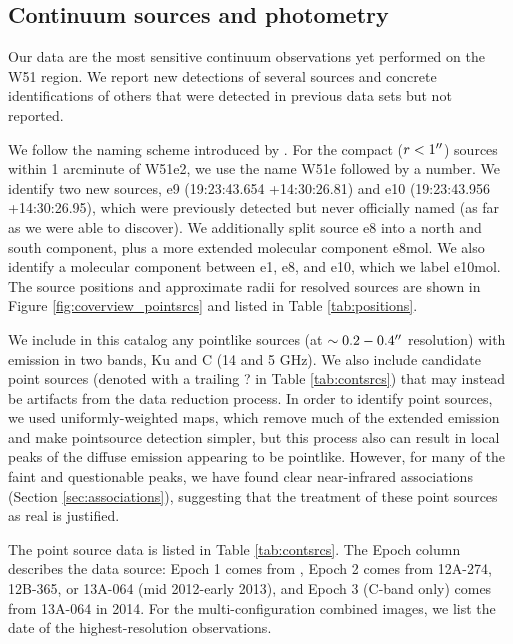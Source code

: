 \subsection{Continuum sources and photometry}
\label{sec:pointsources}
Our data are the most sensitive continuum observations yet performed on the W51
region.  We report new detections of several sources and concrete
identifications of others that were detected in previous data sets but not
reported.

We follow the naming scheme introduced by \citet{Mehringer1994a}.  For the
compact ($r<1\mbox{$^{\prime\prime}$}$) sources within 1 arcminute of W51e2, we use the name
W51e followed by a number.  We identify two new sources, e9 (19:23:43.654
+14:30:26.81) and e10 (19:23:43.956 +14:30:26.95), which were previously
detected but never officially named (as far as we were able to discover).
We additionally split source e8 into a north and south component, plus a more
extended molecular component e8mol.  We also identify a molecular component
between e1, e8, and e10, which we label e10mol.  The source positions
and approximate radii for resolved sources are shown in Figure
\ref{fig:coverview_pointsrcs} and listed in Table \ref{tab:positions}.



We include in this catalog any pointlike sources (at $\sim0.2-0.4\mbox{$^{\prime\prime}$}$
resolution) with emission in two bands, Ku and C (14 and 5 GHz).  We also
include candidate point sources (denoted with a trailing ? in Table
\ref{tab:contsrcs}) that may instead be artifacts from the data reduction
process.  In order to identify point sources, we used
uniformly-weighted maps, which remove much of the extended emission and make
pointsource detection simpler, but this process also can result in local peaks
of the diffuse emission appearing to be pointlike.  However, for many of the
faint and questionable peaks, we have found clear near-infrared associations
(Section \ref{sec:associations}),
suggesting that the treatment of these point sources as real is justified.

The point source data is listed in Table \ref{tab:contsrcs}.  The Epoch column
describes the data source: Epoch 1 comes from \citet{Mehringer1994a}, Epoch 2
comes from 12A-274, 12B-365, or 13A-064 (mid 2012-early
2013), and Epoch 3 (C-band only) comes from
13A-064 in 2014. For the multi-configuration combined images, we list the date
of the highest-resolution observations.

